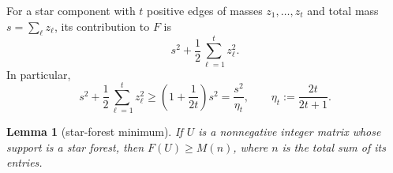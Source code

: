 \documentclass[12pt]{article}
\theoremstyle{plain}
\newtheorem{lemma}[theorem]{Lemma}
\theoremstyle{definition}
\theoremstyle{remark}
\begin{document}
For a star component with \(t\) positive edges of masses
\(z_1,\ldots,z_t\) and total mass \(s=\sum_\ell z_\ell\), its contribution to
\(F\) is
\begin{equation}\label{eq:star-cost}
  s^2+\frac12\sum_{\ell=1}^t z_\ell^2.
\end{equation}
In particular,
\begin{equation}\label{eq:star-efficiency}
  s^2+\frac12\sum_{\ell=1}^t z_\ell^2
  \ge \left(1+\frac1{2t}\right)s^2
  =\frac{s^2}{\eta_t},
  \qquad
  \eta_t:=\frac{2t}{2t+1}.
\end{equation}

\begin{lemma}[star-forest minimum]\label{lem:star-forest}
If \(U\) is a nonnegative integer matrix whose support is a star forest, then
\(F(U)\ge M(n)\), where \(n\) is the total sum of its entries.
\end{lemma}
\end{document}
